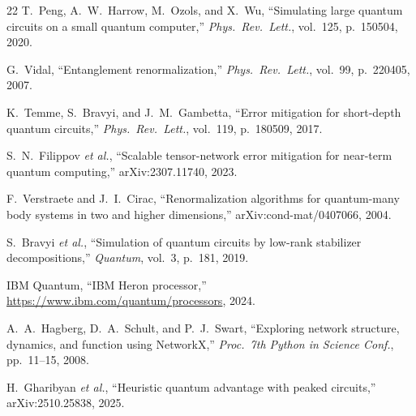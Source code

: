\documentclass[11pt,a4paper]{article}
\begin{document}
\begin{thebibliography}{22}
T.~Peng, A.~W.~Harrow, M.~Ozols, and X.~Wu,
``Simulating large quantum circuits on a small quantum computer,''
\emph{Phys.\ Rev.\ Lett.}, vol.~125, p.~150504, 2020.

G.~Vidal,
``Entanglement renormalization,''
\emph{Phys.\ Rev.\ Lett.}, vol.~99, p.~220405, 2007.

K.~Temme, S.~Bravyi, and J.~M.~Gambetta,
``Error mitigation for short-depth quantum circuits,''
\emph{Phys.\ Rev.\ Lett.}, vol.~119, p.~180509, 2017.

S.~N.~Filippov \emph{et al.},
``Scalable tensor-network error mitigation for near-term quantum computing,''
arXiv:2307.11740, 2023.

F.~Verstraete and J.~I.~Cirac,
``Renormalization algorithms for quantum-many body systems in two and higher dimensions,''
arXiv:cond-mat/0407066, 2004.

S.~Bravyi \emph{et al.},
``Simulation of quantum circuits by low-rank stabilizer decompositions,''
\emph{Quantum}, vol.~3, p.~181, 2019.

IBM Quantum,
``IBM Heron processor,''
\url{https://www.ibm.com/quantum/processors}, 2024.

A.~A.~Hagberg, D.~A.~Schult, and P.~J.~Swart,
``Exploring network structure, dynamics, and function using NetworkX,''
\emph{Proc.\ 7th Python in Science Conf.}, pp.~11--15, 2008.

H.~Gharibyan \emph{et al.},
``Heuristic quantum advantage with peaked circuits,''
arXiv:2510.25838, 2025.

\end{thebibliography}
\end{document}
